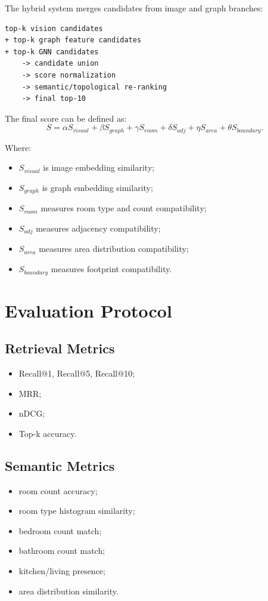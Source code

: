 \documentclass[11pt,a4paper]{article}
\begin{document}
The hybrid system merges candidates from image and graph branches:

\begin{verbatim}
top-k vision candidates
+ top-k graph feature candidates
+ top-k GNN candidates
    -> candidate union
    -> score normalization
    -> semantic/topological re-ranking
    -> final top-10
\end{verbatim}

The final score can be defined as:
\[
S = \alpha S_{visual} + \beta S_{graph} + \gamma S_{room} + \delta S_{adj} + \eta S_{area} + \theta S_{boundary}.
\]

Where:
\begin{itemize}
    \item $S_{visual}$ is image embedding similarity;
    \item $S_{graph}$ is graph embedding similarity;
    \item $S_{room}$ measures room type and count compatibility;
    \item $S_{adj}$ measures adjacency compatibility;
    \item $S_{area}$ measures area distribution compatibility;
    \item $S_{boundary}$ measures footprint compatibility.
\end{itemize}

\section{Evaluation Protocol}

\subsection{Retrieval Metrics}

\begin{itemize}
    \item Recall@1, Recall@5, Recall@10;
    \item MRR;
    \item nDCG;
    \item Top-k accuracy.
\end{itemize}

\subsection{Semantic Metrics}

\begin{itemize}
    \item room count accuracy;
    \item room type histogram similarity;
    \item bedroom count match;
    \item bathroom count match;
    \item kitchen/living presence;
    \item area distribution similarity.
\end{itemize}
\end{document}

